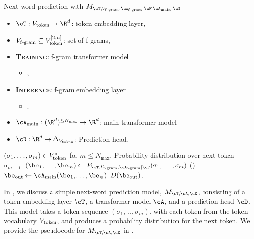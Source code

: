 \begin{algorithm}[h]
\caption{Next-word prediction with \SCONE  $M_{\cT, \Vfgram, \train{\Afgram}|\infer{\cF}, \Amain, \cD}$}
\label{alg:scone-model}
\begin{algorithmic}
\begin{itemize}[itemsep=-3pt]
    \item $\cT : \Vtoken \to \R^d$: token embedding layer,
    \item $V_{\mathrm{f\text{-}gram}} \subseteq V_{\mathrm{token}}^{[2,n]}$: set of f-grams,
    \item \textbf{\textsc{Training}}: f-gram transformer model
    \begin{itemize}[leftmargin=8mm,label=$\triangleright$,itemsep=-3pt,topsep=-4pt]
        \item {},
    \end{itemize}
    \item \textbf{\textsc{Inference}}: f-gram embedding layer
    \begin{itemize}[leftmargin=8mm,label=$\triangleright$,itemsep=-3pt,topsep=-4pt]
        \item {}.
    \end{itemize}
    \item $\Amain : (\R^d)^{\le N_{\max}} \to \R^d$: main transformer model
    \item $\cD : \R^d \to \Delta_{\Vtoken}$: Prediction head.
\end{itemize}
 $(\sigma_1, \ldots, \sigma_m) \in V_{\mathrm{token}}^*$ for $m \le N_{\max}$.
 Probability distribution over next token $\hat{\sigma}_{m+1}$.
\STATE $(\be_1, \ldots, \be_m) \gets F_{\cT, \Vfgram, \train{\Afgram} | \infer{\cF}}(\sigma_1, \ldots, \sigma_m)$ ()
\STATE $\be_{\mathrm{out}} \gets \Amain(\be_1, \ldots, \be_m)$
\RETURN $D(\be_{\mathrm{out}})$.
\end{algorithmic}
\end{algorithm}

In , we discuss a simple next-word prediction model, \( M_{\cT, \cA, \cD} \), consisting of a token embedding layer \( \cT \), a transformer model \( \cA \), and a prediction head \( \cD \). This model takes a token sequence \( (\sigma_1, \ldots, \sigma_m) \), with each token from the token vocabulary \( V_{\mathrm{token}} \), and produces a probability distribution for the next token. We provide the pseudocode for \( M_{\cT, \cA, \cD} \) in .





